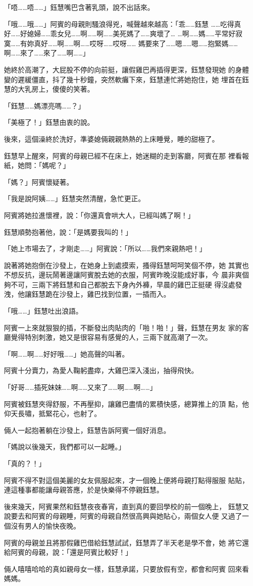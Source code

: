 「唔……唔……」鈺慧嘴巴含著乳頭，說不出話來。

「哦……哦……」阿賓的母親則騷浪得兇，喊聲越來越高：「乖……鈺慧
……吃得真好……好媳婦……乖女兒……啊……啊……美死媽了……爽壞了…
…啊……媽……平常好寂寞……有妳真好……啊……啊……哎呀……哎呀……
媽要來了……嗯……嗯……抱緊媽……啊……來了……來了……啊……」

她終於高潮了，大屁股不停的向前挺，讓假雞巴再插得更深，鈺慧發現她
的身體變的遲緩僵直，抖了幾十秒鐘，突然軟癱下來，鈺慧連忙將她抱住，她
埋首在鈺慧的大乳房上，傻傻的笑著。

「鈺慧……媽漂亮嗎……？」

「美極了！」鈺慧由衷的說。

後來，這個澡終於洗好，準婆媳倆親親熱熱的上床睡覺，睡的甜極了。

鈺慧早上醒來，阿賓的母親已經不在床上，她迷糊的走到客廳，阿賓在那
裡看報紙，她問：「媽呢？」

「媽？」阿賓懷疑著。

「我是說阿姨……」鈺慧突然清醒，急忙更正。

阿賓將她拉進懷裡，說：「你還真會哄大人，已經叫媽了啊！」

鈺慧順勢抱著他，說：「是媽要我叫的！」

「她上市場去了，才剛走……」阿賓說：「所以……我們來親熱吧！」

說著將她抱倒在沙發上，在她身上到處摸索，搔得鈺慧呵呵笑個不停，她
其實也不想反抗，邊玩鬧著邊讓阿賓脫去她的衣服，阿賓昨晚沒能成好事，今
晨非爽個夠不可，三兩下將鈺慧和自己都脫去下身內外褲，早晨的雞巴正挺硬
得沒處發洩，他讓鈺慧跪在沙發上，雞巴找到位置，一插而入。

「哦……」鈺慧吐出浪語。

阿賓一上來就狠狠的插，不斷發出肉貼肉的「啪！啪！」聲，鈺慧在男友
家的客廳覺得特別刺激，她又是很容易有感覺的人，三兩下就高潮了一次。

「啊……啊……好好哦……」她高聲的叫著。

阿賓十分賣力，為愛人鞠躬盡瘁，大雞巴深入淺出，抽得飛快。

「好哥……插死妹妹……啊……又來了……啊……啊……」

阿賓被鈺慧夾得舒服，不再壓抑，讓雞巴盡情的累積快感，總算推上的頂
點，他仰天長嘯，抵緊花心，也射了。

倆人一起抱著躺在沙發上，鈺慧告訴阿賓一個好消息。

「媽說以後幾天，我們都可以一起睡。」

「真的？！」

阿賓不得不對這個美麗的女友佩服起來，才一個晚上便將母親打點得服服
貼貼，連這種事都能讓母親答應，於是快樂得不停親鈺慧。

後來幾天，阿賓果然和鈺慧夜夜春宵，直到真的要回學校的前一個晚上，
鈺慧又說要去和阿賓的母親睡，阿賓的母親自然很高興與她貼心，兩個女人便
又過了一個沒有男人的愉快夜晚。

阿賓的母親並且將那假雞巴借給鈺慧試試，鈺慧弄了半天老是學不會，她
將它還給阿賓的母親，說：「還是阿賓比較好！」

倆人嘻嘻哈哈的真如親母女一樣，鈺慧承諾，只要放假有空，都會和阿賓
回來看媽媽。










